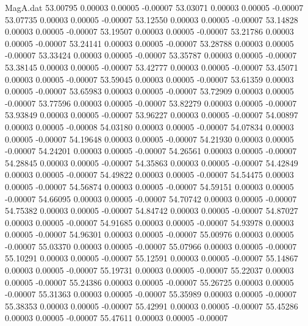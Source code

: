 \begin{filecontents}{MagA.dat}
  53.00795    0.00003    0.00005   -0.00007
  53.03071    0.00003    0.00005   -0.00007
  53.07735    0.00003    0.00005   -0.00007
  53.12550    0.00003    0.00005   -0.00007
  53.14828    0.00003    0.00005   -0.00007
  53.19507    0.00003    0.00005   -0.00007
  53.21786    0.00003    0.00005   -0.00007
  53.24141    0.00003    0.00005   -0.00007
  53.28788    0.00003    0.00005   -0.00007
  53.33424    0.00003    0.00005   -0.00007
  53.35787    0.00003    0.00005   -0.00007
  53.38145    0.00003    0.00005   -0.00007
  53.42777    0.00003    0.00005   -0.00007
  53.45071    0.00003    0.00005   -0.00007
  53.59045    0.00003    0.00005   -0.00007
  53.61359    0.00003    0.00005   -0.00007
  53.65983    0.00003    0.00005   -0.00007
  53.72909    0.00003    0.00005   -0.00007
  53.77596    0.00003    0.00005   -0.00007
  53.82279    0.00003    0.00005   -0.00007
  53.93849    0.00003    0.00005   -0.00007
  53.96227    0.00003    0.00005   -0.00007
  54.00897    0.00003    0.00005   -0.00008
  54.03180    0.00003    0.00005   -0.00007
  54.07834    0.00003    0.00005   -0.00007
  54.19648    0.00003    0.00005   -0.00007
  54.21930    0.00003    0.00005   -0.00007
  54.24201    0.00003    0.00005   -0.00007
  54.26561    0.00003    0.00005   -0.00007
  54.28845    0.00003    0.00005   -0.00007
  54.35863    0.00003    0.00005   -0.00007
  54.42849    0.00003    0.00005   -0.00007
  54.49822    0.00003    0.00005   -0.00007
  54.54475    0.00003    0.00005   -0.00007
  54.56874    0.00003    0.00005   -0.00007
  54.59151    0.00003    0.00005   -0.00007
  54.66095    0.00003    0.00005   -0.00007
  54.70742    0.00003    0.00005   -0.00007
  54.75382    0.00003    0.00005   -0.00007
  54.84742    0.00003    0.00005   -0.00007
  54.87027    0.00003    0.00005   -0.00007
  54.91685    0.00003    0.00005   -0.00007
  54.93978    0.00003    0.00005   -0.00007
  54.96301    0.00003    0.00005   -0.00007
  55.00976    0.00003    0.00005   -0.00007
  55.03370    0.00003    0.00005   -0.00007
  55.07966    0.00003    0.00005   -0.00007
  55.10291    0.00003    0.00005   -0.00007
  55.12591    0.00003    0.00005   -0.00007
  55.14867    0.00003    0.00005   -0.00007
  55.19731    0.00003    0.00005   -0.00007
  55.22037    0.00003    0.00005   -0.00007
  55.24386    0.00003    0.00005   -0.00007
  55.26725    0.00003    0.00005   -0.00007
  55.31363    0.00003    0.00005   -0.00007
  55.35989    0.00003    0.00005   -0.00007
  55.38353    0.00003    0.00005   -0.00007
  55.42991    0.00003    0.00005   -0.00007
  55.45286    0.00003    0.00005   -0.00007
  55.47611    0.00003    0.00005   -0.00007

\end{filecontents}
